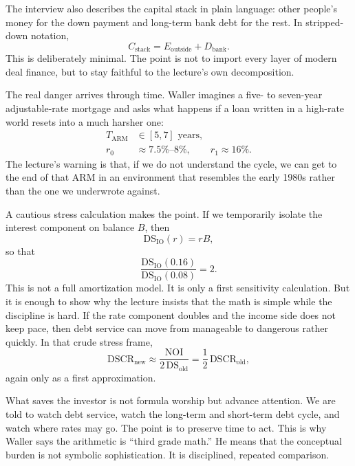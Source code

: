 The interview also describes the capital stack in plain language: other people's money for the down payment and long-term bank debt for the rest. In stripped-down notation,
\begin{equation}
C_{\text{stack}} = E_{\text{outside}} + D_{\text{bank}}.
\end{equation}
This is deliberately minimal. The point is not to import every layer of modern deal finance, but to stay faithful to the lecture's own decomposition.

The real danger arrives through time. Waller imagines a five- to seven-year adjustable-rate mortgage and asks what happens if a loan written in a high-rate world resets into a much harsher one:
\begin{align}
T_{\mathrm{ARM}} &\in [5,7] \text{ years},\\
r_0 &\approx 7.5\%\text{--}8\%, \qquad r_1 \approx 16\%.
\end{align}
The lecture's warning is that, if we do not understand the cycle, we can get to the end of that ARM in an environment that resembles the early 1980s rather than the one we underwrote against.

A cautious stress calculation makes the point. If we temporarily isolate the interest component on balance \(B\), then
\begin{equation}
\mathrm{DS}_{\text{IO}}(r)=rB,
\end{equation}
so that
\begin{equation}
\frac{\mathrm{DS}_{\text{IO}}(0.16)}{\mathrm{DS}_{\text{IO}}(0.08)} = 2.
\end{equation}
This is not a full amortization model. It is only a first sensitivity calculation. But it is enough to show why the lecture insists that the math is simple while the discipline is hard. If the rate component doubles and the income side does not keep pace, then debt service can move from manageable to dangerous rather quickly. In that crude stress frame,
\begin{equation}
\mathrm{DSCR}_{\text{new}}
\approx
\frac{\mathrm{NOI}}{2\,\mathrm{DS}_{\text{old}}}
=
\frac{1}{2}\,\mathrm{DSCR}_{\text{old}},
\end{equation}
again only as a first approximation.

What saves the investor is not formula worship but advance attention. We are told to watch debt service, watch the long-term and short-term debt cycle, and watch where rates may go. The point is to preserve time to act. This is why Waller says the arithmetic is ``third grade math.'' He means that the conceptual burden is not symbolic sophistication. It is disciplined, repeated comparison.

